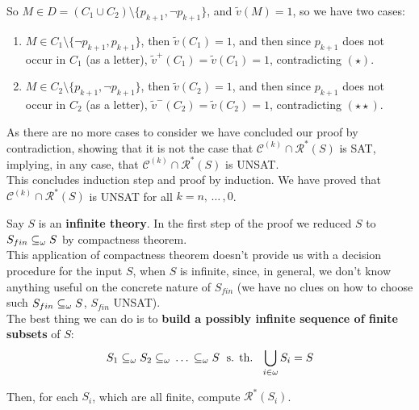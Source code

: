 So $M \in D = (C_1 \cup C_2) \setminus \{p_{k+1}, \neg p_{k+1}\}$, and $\tilde v(M) = 1$, so we have two cases: 
\begin{enumerate}
	\item $M \in C_1 \setminus \{ \neg p_{k+1}, p_{k+1}\}$, then $\tilde v (C_1) = 1$, and then since $p_{k+1}$ does not occur in $C_1$ (as a letter), $\tilde v^+ (C_1) = \tilde v (C_1) = 1$, contradicting $(\star)$.\\
	
	\item $M \in C_2 \setminus \{p_{k+1}, \neg p_{k+1} \}$, then  $\tilde v (C_2) = 1$, and then since $p_{k+1}$ does not occur in $C_2$ (as a letter), $\tilde v^- (C_2) = \tilde v (C_2) = 1$, contradicting $(\star \star)$.\\
\end{enumerate}

As there are no more cases to consider we have concluded our proof by contradiction, showing that it is not the case that $\mathcal{C}^{(k)} \cap \mathcal{R}^\ast (S)$ is SAT, implying, in any case, that $\mathcal{C}^{(k)} \cap \mathcal{R}^\ast (S)$ is UNSAT.\\

This concludes induction step and proof by induction. We have proved that $\mathcal{C}^{(k)} \cap \mathcal{R}^\ast (S)$ is UNSAT for all $k = n, \, \dots \, , 0$.\\



\begin{remark}
	Say $S$ is an \textbf{infinite theory}. In the first step of the proof we reduced $S$ to $S_{fin} \subseteq_\omega S$ by compactness theorem.\\
	
	This application of compactness theorem doesn't provide us with a decision procedure for the input $S$, when $S$ is infinite, since, in general, we don't know anything useful on the concrete nature of $S_{fin}$ (we have no clues on how to choose such $S_{fin} \subseteq_\omega S$, $S_{fin}$ UNSAT).\\
	
	The best thing we can do is to \textbf{build a possibly infinite sequence of finite subsets} of $S$:
	$$ 
	S_1 \subseteq_\omega S_2 \subseteq_\omega \, \dots \, \subseteq_\omega S \; \text{ s. th. } \; \bigcup_{i \in \omega} S_i = S
	$$
	
	Then, for each $S_i$, which are all finite, compute $\mathcal{R}^\ast (S_i)$.\\
\end{remark}

